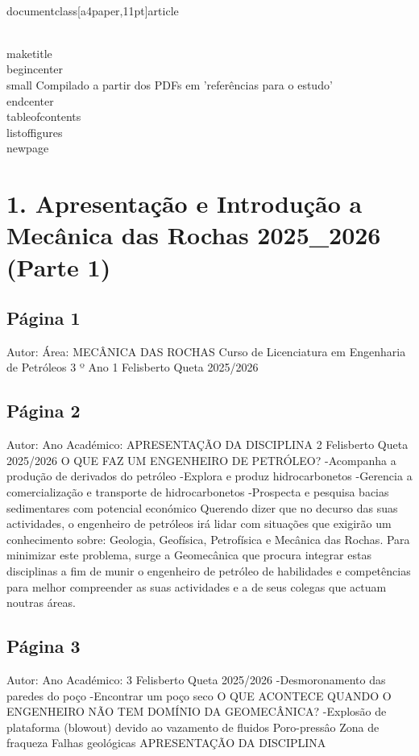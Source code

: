 \\documentclass[a4paper,11pt]{article}
\begin{document}
\\maketitle
\\begin{center}\\small
Compilado a partir dos PDFs em 'referências para o estudo'
\\end{center}
\\tableofcontents
\\listoffigures
\\newpage
\section{1. Apresentação e Introdução a Mecânica das Rochas 2025\_2026 (Parte 1)}


\subsection*{Página 1}
Autor:
Área:
MECÂNICA DAS ROCHAS
Curso de Licenciatura em Engenharia de Petróleos
3 º Ano
1
Felisberto Queta
2025/2026



\subsection*{Página 2}
Autor:
Ano Académico:
APRESENTAÇÃO DA DISCIPLINA
2
Felisberto Queta
2025/2026
O QUE FAZ UM ENGENHEIRO DE PETRÓLEO? 
-Acompanha 
a produção de derivados 
do petróleo
-Explora e produz 
hidrocarbonetos
-Gerencia a  comercialização 
e transporte de 
hidrocarbonetos
-Prospecta e pesquisa 
bacias sedimentares com 
potencial económico
Querendo dizer que no decurso das suas
actividades, o engenheiro de petróleos irá
lidar
com
situações
que
exigirão
um
conhecimento sobre:
Geologia, Geofísica, Petrofísica e
Mecânica das Rochas.
Para
minimizar
este
problema,
surge
a
Geomecânica
que
procura
integrar
estas
disciplinas a fim de munir o engenheiro de
petróleo de habilidades e competências para
melhor compreender as suas actividades e a
de seus colegas que actuam noutras áreas.



\subsection*{Página 3}
Autor:
Ano Académico:
3
Felisberto Queta
2025/2026
-Desmoronamento das paredes do poço
-Encontrar um poço seco
O QUE ACONTECE QUANDO O ENGENHEIRO NÃO TEM DOMÍNIO DA GEOMECÂNICA? 
-Explosão de plataforma (blowout) devido 
ao vazamento de fluidos
Poro-pressâo
Zona de 
fraqueza
Falhas 
geológicas
APRESENTAÇÃO DA DISCIPLINA
\end{document}
